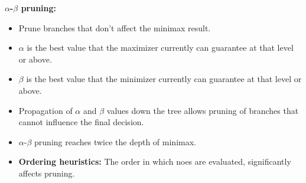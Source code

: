 \documentclass[12pt,a4paper]{article}
\begin{document}
\vspace{10pt}
\textbf{$\alpha$-$\beta$ pruning:}
\begin{itemize}
    \item Prune branches that don't affect the minimax result. 
    \item $\alpha$ is the best value that the maximizer currently can guarantee at that level or above. 
    \item $\beta$ is the best value that the minimizer currently can guarantee at that level or above.
    \item Propagation of $\alpha$ and $\beta$ values down the tree allows pruning of branches that cannot influence the final decision.
    \item $\alpha$-$\beta$ pruning reaches twice the depth of minimax.
    \item \textbf{Ordering heuristics:} The order in which noes are evaluated, significantly affects pruning.
\end{itemize}
\end{document}
